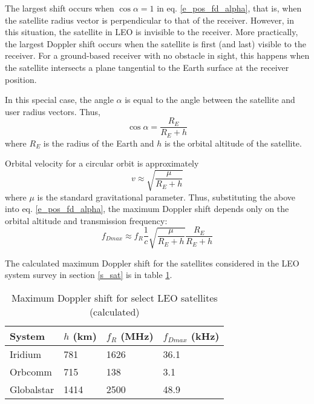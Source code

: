 The largest shift occurs when $\cos{\alpha} = 1$ in eq. \ref{e_pos_fd_alpha}, that is, when the satellite radius vector is perpendicular to that of the receiver. However, in this situation, the satellite in LEO is invisible to the receiver. More practically, the largest Doppler shift occurs when the satellite is first (and last) visible to the receiver. For a ground-based receiver with no obstacle in sight, this happens when the satellite intersects a plane tangential to the Earth surface at the receiver position.

In this special case, the angle $\alpha$ is equal to the angle between the satellite and user radius vectors. Thus,
\begin{equation*}
    \cos{\alpha} = \frac{R_E}{R_E + h}
\end{equation*}
where $R_E$ is the radius of the Earth and $h$ is the orbital altitude of the satellite.

Orbital velocity for a circular orbit is approximately
\begin{equation*}
    v \approx \sqrt{\frac{\mu}{R_E + h}}
\end{equation*}
where $\mu$ is the standard gravitational parameter. Thus, substituting the above into eq. \ref{e_pos_fd_alpha}, the maximum Doppler shift depends only on the orbital altitude and transmission frequency:
\begin{equation}
    \label{e_pos_fd_max}
    f_{D max} \approx f_R \frac{1}{c} \sqrt{\frac{\mu}{R_E + h}} \frac{R_E}{R_E + h}
\end{equation}

The calculated maximum Doppler shift for the satellites considered in the LEO system survey in section \ref{s_sat} is in table \ref{t_pos_max_fd}.

\begin{table}
    \centering
    \begin{tabular}{llll}
    System     & $h$ (km) &  $f_R$ (MHz) & $f_{Dmax}$ (kHz) \\ \hline
    Iridium    &  781  &  1626 & \num{36.1} \\
    Orbcomm    &  715  &  138  & \num{3.1} \\
    Globalstar &  1414 &  2500 & \num{48.9}
    \end{tabular}
    \caption{Maximum Doppler shift for select LEO satellites (calculated)}
    \label{t_pos_max_fd}
\end{table}



